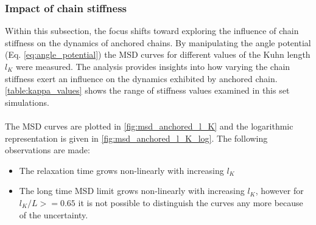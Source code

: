 \documentclass[
    paper=A4,pagesize=automedia,fontsize=12pt,
    BCOR=15mm,DIV=22,
    twoside,headinclude,footinclude=false,
    fleqn,             %
    bibliography=totocnumbered,          %
    listof=totoc,                %
    listof=flat,                 %
    cleardoublepage=empty      %
    numbers=endperiod
]{scrartcl}
\begin{document}
\FloatBarrier


\subsubsection{Impact of chain stiffness} \label{sec:impact_of_chain_stiffness}
Within this subsection, the focus shifts 
toward exploring the influence of chain stiffness on
the dynamics of anchored chains. 
By manipulating the angle potential (Eq. \ref{eq:angle_potential})
the MSD curves for different values
of the Kuhn length $l_K$ were measured. 
The analysis provides insights into 
how varying the chain stiffness exert an influence on the 
dynamics exhibited by anchored chain.
\autoref{table:kappa_values} shows the range of stiffness values examined
in this set simulations.
\\
\\
The MSD curves are plotted in \autoref{fig:msd_anchored_l_K} and the logarithmic
representation is given in \autoref{fig:msd_anchored_l_K_log}.
The following observations are made:
\begin{itemize}
    \item The relaxation time grows non-linearly with increasing $l_K$
    \item The long time MSD limit grows non-linearly with increasing $l_K$,
    however for $l_K/L >= 0.65$ it is not possible to distinguish 
    the curves any more because of the uncertainty.
\end{itemize}
\end{document}
